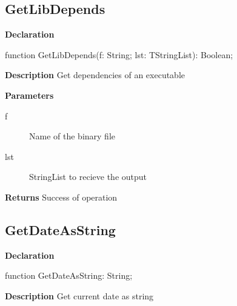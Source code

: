 \documentclass{report}
\newif\ifpdf
\begin{document}
\subsection*{GetLibDepends}
\fi
\label{licommon-GetLibDepends}
\begin{list}{}{
\setlength{\itemindent}{0cm}
\setlength{\listparindent}{0cm}
\setlength{\leftmargin}{\evensidemargin}
\addtolength{\leftmargin}{\tmplength}
\settowidth{\labelsep}{X}
\addtolength{\leftmargin}{\labelsep}
\setlength{\labelwidth}{\tmplength}
}
\item[\textbf{Declaration}\hfill]
\ifpdf
\begin{flushleft}
\fi
\begin{ttfamily}
function GetLibDepends(f: String; lst: TStringList): Boolean;\end{ttfamily}

\ifpdf
\end{flushleft}
\fi

\par
\item[\textbf{Description}]
Get dependencies of an executable   \par
\item[\textbf{Parameters}]
\begin{description}
\item[f] Name of the binary file
\item[lst] StringList to recieve the output
\end{description}
\item[\textbf{Returns}]Success of operation


\end{list}
\ifpdf
\subsection*{\large{\textbf{GetDateAsString}}\normalsize\hspace{1ex}\hrulefill}
\else
\subsection*{GetDateAsString}
\fi
\label{licommon-GetDateAsString}
\begin{list}{}{
\setlength{\itemindent}{0cm}
\setlength{\listparindent}{0cm}
\setlength{\leftmargin}{\evensidemargin}
\addtolength{\leftmargin}{\tmplength}
\settowidth{\labelsep}{X}
\addtolength{\leftmargin}{\labelsep}
\setlength{\labelwidth}{\tmplength}
}
\item[\textbf{Declaration}\hfill]
\ifpdf
\begin{flushleft}
\fi
\begin{ttfamily}
function GetDateAsString: String;\end{ttfamily}

\ifpdf
\end{flushleft}
\fi

\par
\item[\textbf{Description}]
Get current date as string

\end{list}
\end{document}

